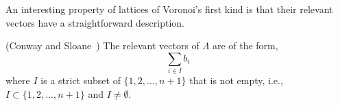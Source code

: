 \documentclass[final,leqno]{siamltex}
\begin{document}
An interesting property of lattices of Voronoi's first kind is that their relevant vectors have a straightforward description.

\begin{theorem} \label{thm:revvecssuperbase} (Conway and Sloane~\cite[Theorem~3]{ConwaySloane1992_voronoi_lattice_3d_obtuse_superbases})
The relevant vectors of $\Lambda$ are of the form,
\[
\sum_{i \in I} b_i
\]
where $I$ is a strict subset of $\{1, 2, \dots, n+1\}$ that is not empty, i.e., $I \subset \{1, 2, \dots, n+1\}$ and $I \neq \emptyset$.
\end{theorem}  
 
\end{document}
